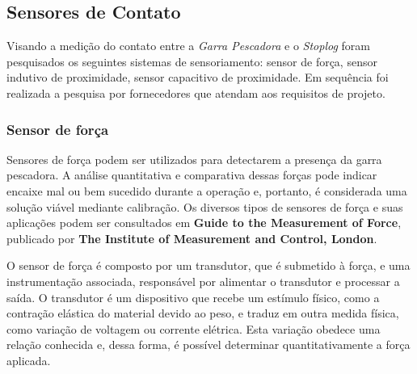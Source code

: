





\subsection{Sensores de Contato}

Visando a medição do contato entre a \emph{Garra Pescadora} e o \emph{Stoplog} foram pesquisados os seguintes sistemas de sensoriamento: sensor de força, sensor indutivo de proximidade,  sensor capacitivo de proximidade. Em sequência foi realizada a
 pesquisa por fornecedores que atendam aos requisitos de projeto.
 


\subsubsection{Sensor de força}

 Sensores de força podem ser utilizados para detectarem a presença da garra pescadora. A análise quantitativa e comparativa dessas forças pode indicar encaixe mal ou bem sucedido durante a operação e, portanto, é considerada uma solução viável mediante calibração. Os diversos tipos de sensores de força e suas aplicações podem ser consultados em \textbf{Guide to the Measurement of Force}, publicado por \textbf{The Institute of Measurement and Control, London}.

 O sensor de força é composto por um transdutor, que é submetido à força, e uma instrumentação associada, responsável por alimentar o transdutor e processar a saída. O transdutor é um dispositivo que recebe um estímulo físico, como a contração elástica do material devido ao peso, e traduz em outra medida física, como variação de voltagem ou corrente elétrica. Esta variação obedece uma relação conhecida e, dessa forma, é possível determinar quantitativamente a força aplicada.

